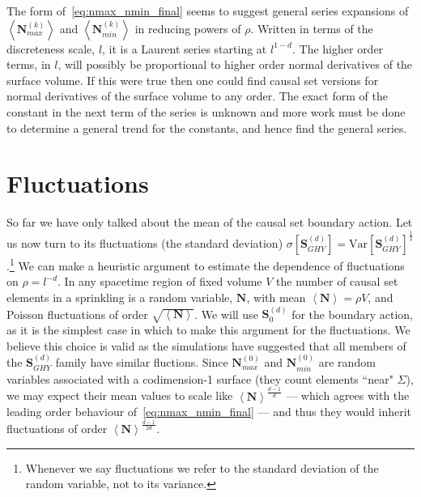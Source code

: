 \documentclass[12pt]{article}
\begin{document}
The form of~\eqref{eq:nmax_nmin_final} seems to suggest general series expansions of $\left\langle \textbf{N}_{max}^{ (k)}\right\rangle$ and $\left\langle \textbf{N}_{min}^{ (k)}\right\rangle$ in reducing powers of $\rho$. Written in terms of the discreteness scale, $l$, it is a Laurent series starting at $l^{1-d}$. The higher order terms, in $l$, will possibly be proportional to higher order normal derivatives of the surface volume. If this were true then one could find causal set versions for normal derivatives of the surface volume to any order. The exact form of the constant in the next term of the series is unknown and more work must be done to determine a general trend for the constants, and hence find the general series.

\section{Fluctuations}
So far we have only talked about the mean of the causal set boundary action. Let us now turn to its fluctuations (the standard deviation) $\sigma[\textbf{S}^{ (d)}_{GHY}]=\text{Var}[\textbf{S}^{ (d)}_{GHY}]^\frac12$.\footnote{Whenever we say fluctuations we refer to the standard deviation of the random variable, not to its variance.} We can make a heuristic argument to estimate the dependence of fluctuations on $\rho=l^{-d}$. In any spacetime region of fixed volume $V$ the number of causal set elements in a sprinkling is a random variable, $\textbf{N}$, with mean $\left\langle\textbf{N}\right\rangle=\rho V$, and Poisson fluctuations of order $\sqrt{\left\langle\textbf{N}\right\rangle}$. We will use $\textbf{S}^{ (d)}_{0}$ for the boundary action, as it is the simplest case in which to make this argument for the fluctuations. We believe this choice is valid as the simulations have suggested that all members of the $\textbf{S}^{ (d)}_{GHY}$ family have similar fluctions. Since $\textbf{N}_{max}^{ (0)}$ and $\textbf{N}_{min}^{ (0)}$ are random variables associated with a codimension-1 surface (they count elements ``near" $\Sigma$), we may expect their mean values to scale like $\left\langle\textbf{N}\right\rangle^\frac{d-1}{d}$ --- which agrees with the leading order behaviour of~\eqref{eq:nmax_nmin_final} --- and thus they would inherit fluctuations of order $\left\langle\textbf{N}\right\rangle^\frac{d-1}{2d}$. 
\end{document}

